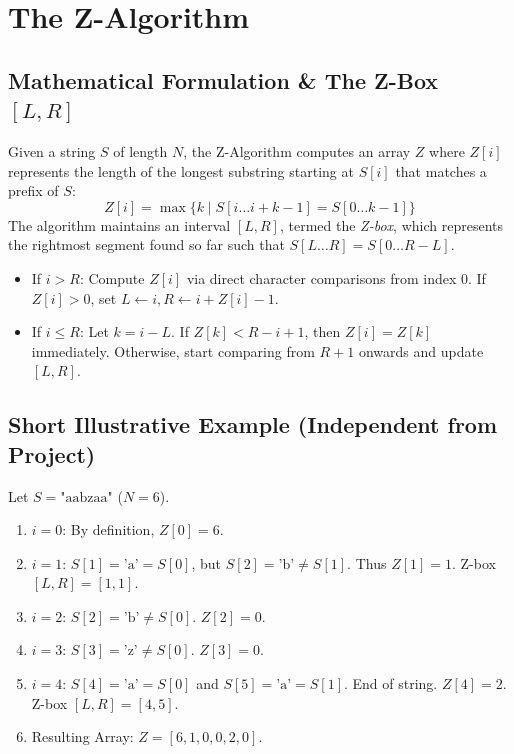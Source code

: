 \section{The Z-Algorithm}
\subsection{Mathematical Formulation \& The Z-Box $[L, R]$}
Given a string $S$ of length $N$, the Z-Algorithm computes an array $Z$ where $Z[i]$ represents the length of the longest substring starting at $S[i]$ that matches a prefix of $S$:
\begin{equation}
Z[i] = \max \{ k \mid S[i \dots i + k - 1] = S[0 \dots k - 1] \}
\end{equation}
The algorithm maintains an interval $[L, R]$, termed the \textit{Z-box}, which represents the rightmost segment found so far such that $S[L \dots R] = S[0 \dots R - L]$.
\begin{itemize}
    \item If $i > R$: Compute $Z[i]$ via direct character comparisons from index 0. If $Z[i] > 0$, set $L \gets i, R \gets i + Z[i] - 1$.
    \item If $i \le R$: Let $k = i - L$. If $Z[k] < R - i + 1$, then $Z[i] = Z[k]$ immediately. Otherwise, start comparing from $R + 1$ onwards and update $[L, R]$.
\end{itemize}

\subsection{Short Illustrative Example (Independent from Project)}
Let $S = \text{"aabzaa"}$ ($N = 6$).
\begin{enumerate}
    \item $i = 0$: By definition, $Z[0] = 6$.
    \item $i = 1$: $S[1] = \text{'a'} = S[0]$, but $S[2] = \text{'b'} \ne S[1]$. Thus $Z[1] = 1$. Z-box $[L, R] = [1, 1]$.
    \item $i = 2$: $S[2] = \text{'b'} \ne S[0]$. $Z[2] = 0$.
    \item $i = 3$: $S[3] = \text{'z'} \ne S[0]$. $Z[3] = 0$.
    \item $i = 4$: $S[4] = \text{'a'} = S[0]$ and $S[5] = \text{'a'} = S[1]$. End of string. $Z[4] = 2$. Z-box $[L, R] = [4, 5]$.
    \item Resulting Array: $Z = [6, 1, 0, 0, 2, 0]$.
\end{enumerate}

